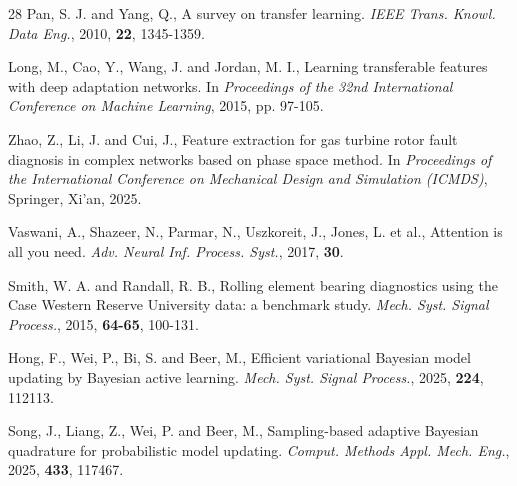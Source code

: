 \begin{thebibliography}{28}
 Pan, S. J. and Yang, Q., A survey on transfer learning. \textit{IEEE Trans. Knowl. Data Eng.}, 2010, \textbf{22}, 1345-1359.

 Long, M., Cao, Y., Wang, J. and Jordan, M. I., Learning transferable features with deep adaptation networks. In \textit{Proceedings of the 32nd International Conference on Machine Learning}, 2015, pp. 97-105.

 Zhao, Z., Li, J. and Cui, J., Feature extraction for gas turbine rotor fault diagnosis in complex networks based on phase space method. In \textit{Proceedings of the International Conference on Mechanical Design and Simulation (ICMDS)}, Springer, Xi'an, 2025.

 Vaswani, A., Shazeer, N., Parmar, N., Uszkoreit, J., Jones, L. et al., Attention is all you need. \textit{Adv. Neural Inf. Process. Syst.}, 2017, \textbf{30}.

 Smith, W. A. and Randall, R. B., Rolling element bearing diagnostics using the Case Western Reserve University data: a benchmark study. \textit{Mech. Syst. Signal Process.}, 2015, \textbf{64-65}, 100-131.

 Hong, F., Wei, P., Bi, S. and Beer, M., Efficient variational Bayesian model updating by Bayesian active learning. \textit{Mech. Syst. Signal Process.}, 2025, \textbf{224}, 112113.

 Song, J., Liang, Z., Wei, P. and Beer, M., Sampling-based adaptive Bayesian quadrature for probabilistic model updating. \textit{Comput. Methods Appl. Mech. Eng.}, 2025, \textbf{433}, 117467.

\end{thebibliography}
